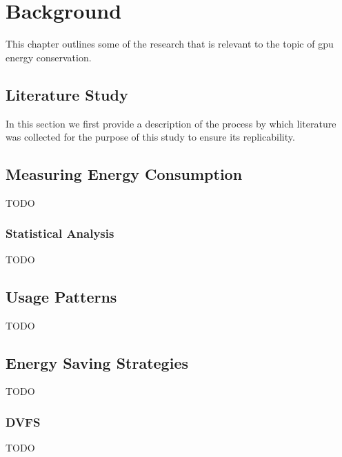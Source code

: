 \chapter{Background}
	This chapter outlines some of the research that is relevant to the topic of \gls{gpu} energy conservation.

	\section{Literature Study}
		In this section we first provide a description of the process by which literature was collected for the purpose of this study to ensure its replicability.

		

	\section{Measuring Energy Consumption}
		TODO

		\subsection{Statistical Analysis}
			TODO

	\section{Usage Patterns}
		TODO

	\section{Energy Saving Strategies}
		TODO

		\subsection{DVFS}
			TODO